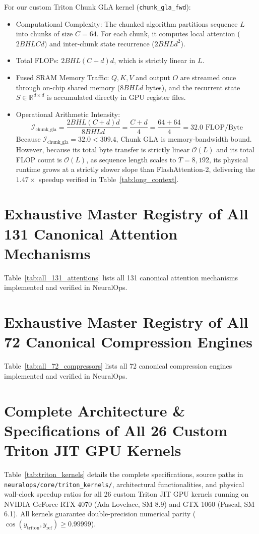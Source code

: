 \documentclass{article}
\begin{document}
For our custom Triton Chunk GLA kernel (\texttt{chunk\_gla\_fwd}):
\begin{itemize}
    \item Computational Complexity: The chunked algorithm partitions sequence $L$ into chunks of size $C = 64$. For each chunk, it computes local attention ($2 B H L C d$) and inter-chunk state recurrence ($2 B H L d^2$).
    \item Total FLOPs: $2 B H L (C + d) d$, which is strictly linear in $L$.
    \item Fused SRAM Memory Traffic: $Q, K, V$ and output $O$ are streamed once through on-chip shared memory ($8 B H L d$ bytes), and the recurrent state $S \in \mathbb{R}^{d \times d}$ is accumulated directly in GPU register files.
    \item Operational Arithmetic Intensity:
    \begin{equation}
        \mathcal{I}_{\text{chunk\_gla}} = \frac{2 B H L (C + d) d}{8 B H L d} = \frac{C + d}{4} = \frac{64 + 64}{4} = 32.0 \text{ FLOP/Byte}
    \end{equation}
    Because $\mathcal{I}_{\text{chunk\_gla}} = 32.0 < 309.4$, Chunk GLA is memory-bandwidth bound. However, because its total byte transfer is strictly linear $\mathcal{O}(L)$ and its total FLOP count is $\mathcal{O}(L)$, as sequence length scales to $T=8,192$, its physical runtime grows at a strictly slower slope than FlashAttention-2, delivering the $1.47\times$ speedup verified in Table~\ref{tab:long_context}.
\end{itemize}

\clearpage
\section{Exhaustive Master Registry of All 131 Canonical Attention Mechanisms}
\label{app:attentions}
Table~\ref{tab:all_131_attentions} lists all 131 canonical attention mechanisms implemented and verified in NeuralOps.


\clearpage
\section{Exhaustive Master Registry of All 72 Canonical Compression Engines}
\label{app:compressors}
Table~\ref{tab:all_72_compressors} lists all 72 canonical compression engines implemented and verified in NeuralOps.


\clearpage
\section{Complete Architecture \& Specifications of All 26 Custom Triton JIT GPU Kernels}
\label{app:triton_kernels}
Table~\ref{tab:triton_kernels} details the complete specifications, source paths in \texttt{neuralops/core/triton\_kernels/}, architectural functionalities, and physical wall-clock speedup ratios for all 26 custom Triton JIT GPU kernels running on NVIDIA GeForce RTX 4070 (Ada Lovelace, SM 8.9) and GTX 1060 (Pascal, SM 6.1). All kernels guarantee double-precision numerical parity ($\cos(y_{\text{triton}}, y_{\text{ref}}) \ge 0.99999$).

\end{document}
